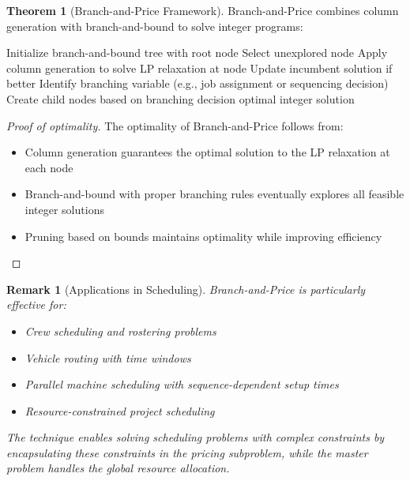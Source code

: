 \documentclass{article}
\newtheorem{remark}{Remark}
\theoremstyle{definition}
\newtheorem{theorem}{Theorem}
\begin{document}
\begin{theorem}[Branch-and-Price Framework]
Branch-and-Price combines column generation with branch-and-bound to solve integer programs:

\begin{algorithm}
\caption{Branch-and-Price for Scheduling}
\begin{algorithmic}[1]
    \State Initialize branch-and-bound tree with root node
        \State Select unexplored node
        \State Apply column generation to solve LP relaxation at node
            \State Update incumbent solution if better
            \State Identify branching variable (e.g., job assignment or sequencing decision)
            \State Create child nodes based on branching decision
        \EndIf
    \EndWhile
    \State \Return optimal integer solution
\EndProcedure
\end{algorithmic}
\end{algorithm}

\begin{proof}[Proof of optimality]
The optimality of Branch-and-Price follows from:
\begin{itemize}
    \item Column generation guarantees the optimal solution to the LP relaxation at each node
    \item Branch-and-bound with proper branching rules eventually explores all feasible integer solutions
    \item Pruning based on bounds maintains optimality while improving efficiency
\end{itemize}
\end{proof}
\end{theorem}

\begin{remark}[Applications in Scheduling]
Branch-and-Price is particularly effective for:
\begin{itemize}
    \item Crew scheduling and rostering problems
    \item Vehicle routing with time windows
    \item Parallel machine scheduling with sequence-dependent setup times
    \item Resource-constrained project scheduling
\end{itemize}

The technique enables solving scheduling problems with complex constraints by encapsulating these constraints in the pricing subproblem, while the master problem handles the global resource allocation.
\end{remark}
\end{document}
